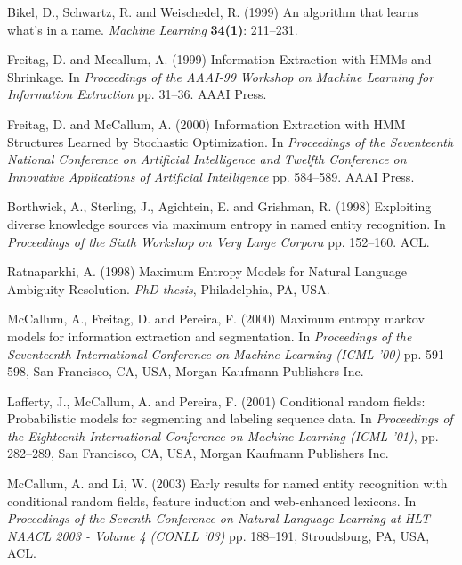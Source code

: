 \documentclass{nle}
\begin{document}
\begin{thebibliography}{}
Bikel, D., Schwartz, R. and Weischedel, R. (1999)
An algorithm that learns what's in a name.
{\it Machine Learning}
{\bf 34(1)}: 211--231.

Freitag, D. and Mccallum, A. (1999)
Information Extraction with HMMs and Shrinkage.
In {\it Proceedings of the AAAI-99 Workshop on Machine Learning for Information Extraction}
pp. 31--36. AAAI Press.

Freitag, D. and McCallum, A. (2000)
Information Extraction with HMM Structures Learned by Stochastic Optimization.
In {\it Proceedings of the Seventeenth National Conference on Artificial Intelligence and Twelfth Conference on Innovative Applications of Artificial Intelligence}
pp. 584--589. AAAI Press.

Borthwick, A., Sterling, J., Agichtein, E. and Grishman, R. (1998)
Exploiting diverse knowledge sources via maximum entropy in named entity recognition.
In {\it Proceedings of the Sixth Workshop on Very Large Corpora}
pp. 152--160. ACL.

Ratnaparkhi, A. (1998)
Maximum Entropy Models for Natural Language Ambiguity Resolution.
{\it PhD thesis}, Philadelphia, PA, USA.

McCallum, A., Freitag, D. and Pereira, F. (2000)
Maximum entropy markov models for information extraction and segmentation.
In {\it Proceedings of the Seventeenth International Conference on Machine Learning (ICML '00)}
pp. 591--598, San Francisco, CA, USA, Morgan Kaufmann Publishers Inc.

Lafferty, J., McCallum, A. and Pereira, F. (2001)
Conditional random fields: Probabilistic models for segmenting and labeling sequence data.
In {\it Proceedings of the Eighteenth International Conference on Machine Learning (ICML '01)}, 
pp. 282--289, San Francisco, CA, USA, Morgan Kaufmann Publishers Inc.

McCallum, A. and Li, W. (2003)
Early results for named entity recognition with conditional random fields, feature induction and web-enhanced lexicons.
In {\it Proceedings of the Seventh Conference on Natural Language Learning at HLT-NAACL 2003 - Volume 4 (CONLL '03)}
pp. 188--191, Stroudsburg, PA, USA, ACL.


\end{thebibliography}
\end{document}
